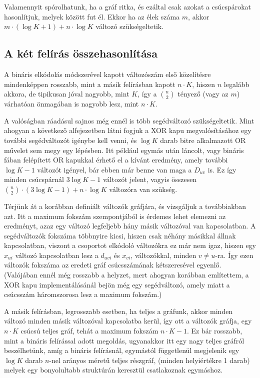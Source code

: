 Valamennyit spórolhatunk, ha a gráf ritka, és ezáltal csak azokat a csúcspárokat hasonlítjuk, melyek között fut él. Ekkor ha az élek száma $m$, akkor $m \cdot ( \log K + 1 ) + n \cdot \log K$ változó szükségeltetik.

\subsection{A két felírás összehasonlítása}

A bináris elkódolás módszerével kapott változószám első közelítésre mindenképpen rosszabb, mint a másik felírásban kapott $n \cdot K$, hiszen $n$ legalább akkora, de tipikusan jóval nagyobb, mint $K$, így a $\binom{n}{2}$ tényező (vagy az $m$) várhatóan önmagában is nagyobb lesz, mint $n \cdot K$.

A valóságban ráadásul sajnos még ennél is több segédváltozó szükségeltetik. Mint ahogyan a következő alfejezetben látni fogjuk a XOR kapu megvalósításához egy további segédváltozót igénybe kell venni, és $\log K$ darab bitre alkalmazott OR művelet sem megy egy lépésben. Itt például egymás után láncolt, vagy bináris fában felépített OR kapukkal érhető el a kívánt eredmény, amely további $\log K -1$ változót igényel, bár ebben már benne van maga a $D_{uv}$ is. Ez így minden csúcspárnál $3\log K - 1$ változót jelent, vagyis összesen $\binom{n}{2} \cdot (3\log K -  1 ) + n \cdot \log K$ változóra van szükség.
 
Térjünk át a korábban definiált változók gráfjára, és vizsgáljuk a továbbiakban azt.
Itt a maximum fokszám szempontjából is érdemes lehet elemezni az eredményt, azaz egy változó legfeljebb hány másik változóval van kapcsolatban. A segédváltozók fokszáma többnyire kicsi, hiszen csak néhány másikkal állnak kapcsolatban, viszont a csoportot elkódoló változókra ez már nem igaz, hiszen egy $x_{ui}$ változó kapcsolatban lesz a $d_{uvi}$ és $x_{vi}$,  változókkal, minden $v \neq u$-ra. Így ezen változók fokszáma az eredeti gráf csúcsszámának kétszeresével egyenlő. (Valójában ennél még rosszabb a helyzet, mert ahogyan korábban említettem, a XOR kapu implementálásánál bejön még egy segédváltozó, amely miatt a csúcsszám háromszorosa lesz a maximum fokszám.)
 
A másik felírásban, legrosszabb esetben, ha teljes a gráfunk, akkor minden változó minden másik változóval kapcsolatba kerül, így ott a változók gráfja, egy $n \cdot K$ csúcsú teljes gráf, tehát a maximum fokszám  $n \cdot K -1$. Ez bár rosszabb, mint a bináris felírással adott megoldás, ugyanakkor itt egy nagy teljes gráfról beszélhetünk, amíg a bináris felírásnál, egymástól függetlenül megjelenik egy $\log K$ darab $n$-nel arányos méretű teljes részgráf, (minden helyiértékre 1 darab) melyek egy bonyolultabb struktúrán keresztül csatlakoznak egymáshoz.

